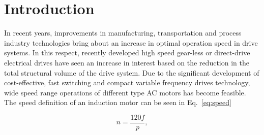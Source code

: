 %

\begin{abstract}
  In recent years, improvements in manufacturing, transportation and process industry
  technologies bring about an increase in optimal operation speed in drive systems. In this
  respect, recently developed high speed gear-less or direct-drive electrical drives have seen an
  increase in interest based on the reduction in the total structural volume of the drive
  system. Due to the significant development of cost-effective, fast switching and compact
  variable frequency drives technology, wide speed range operations of different type AC motors
  has become feasible. The speed definition of an induction motor can be seen in
\end{abstract} 

\tableofcontents

\section{Introduction}

In recent years, improvements in manufacturing, transportation and process industry
technologies bring about an increase in optimal operation speed in drive systems. In this
respect, recently developed high speed gear-less or direct-drive electrical drives have seen an
increase in interest based on the reduction in the total structural volume of the drive
system. Due to the significant development of cost-effective, fast switching and compact
variable frequency drives technology, wide speed range operations of different type AC motors
has become feasible. The speed definition of an induction motor can be seen in Eq.\ \ref{eq:speed}
 
\begin{equation}  \label{eq:speed}
  n = \frac{120 f}{p},
\end{equation}

